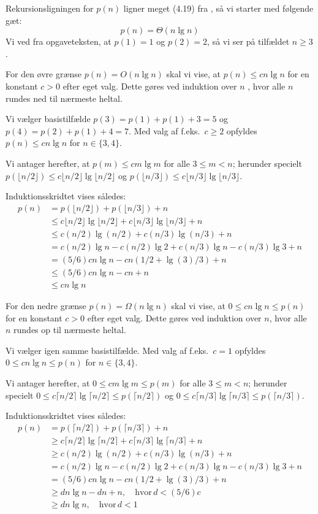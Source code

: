 \documentclass[paper=a4, fleqn]{article}
\newcommand{\clrs}{\textsmaller{CLRS}\xspace}
\begin{document}
Rekursionsligningen for $p(n)$ ligner meget (4.19) fra \clrs, så vi starter
med følgende gæt:
\[
p(n)=\Theta(n\lg n)
\]
Vi ved fra opgaveteksten, at $p(1)=1$ og $p(2)=2$, så vi ser på tilfældet $n\geq
3$.

For den øvre grænse $p(n)=O(n\lg n)$ skal vi vise, at $p(n)\leq cn\lg n$ for en
konstant $c>0$ efter eget valg. Dette gøres ved induktion over $n$ , hvor alle
$n$ rundes ned til nærmeste heltal.

Vi vælger basistilfælde $p(3)=p(1)+p(1)+3 = 5$ og $p(4)=p(2)+p(1)+4=7$. Med valg
af f.eks.\ $c\geq 2$ opfyldes $p(n)\leq cn\lg n$ for $n\in\{3,4\}$.

Vi antager herefter, at $p(m)\leq cm\lg m$ for alle $3\leq m<n$; herunder
specielt $p(\lfloor n/2\rfloor)\leq c\lfloor n/2\rfloor\lg \lfloor n/2\rfloor$
og $p(\lfloor n/3\rfloor)\leq c\lfloor n/3\rfloor\lg \lfloor n/3\rfloor$.

Induktionsskridtet vises således:
\begin{align*}
p(n) &= p(\lfloor n/2\rfloor)+p(\lfloor n/3\rfloor)+n \\
     &\leq c\lfloor n/2\rfloor\lg \lfloor n/2\rfloor + c\lfloor n/3\rfloor\lg
     \lfloor n/3\rfloor + n \\
     &\leq c(n/2)\lg(n/2) + c(n/3)\lg(n/3) + n \\
     &= c(n/2)\lg n - c(n/2)\lg 2 + c(n/3)\lg n - c(n/3)\lg 3 + n \\
     &= (5/6)cn\lg n - cn(1/2 + \lg(3)/3) + n \\
     &\leq (5/6)cn\lg n - cn + n \\
     &\leq cn\lg n
\end{align*}

For den nedre grænse $p(n)=\Omega(n\lg n)$ skal vi vise, at $0\leq cn\lg n\leq p(n)$
for en konstant $c>0$ efter eget valg. Dette gøres ved induktion over $n$, hvor
alle $n$ rundes op til nærmeste heltal.

Vi vælger igen samme basistilfælde. Med valg af f.eks.\ $c=1$ opfyldes
$0\leq cn\lg n\leq p(n)$ for $n\in\{3,4\}$.

Vi antager herefter, at $0\leq cm\lg m\leq p(m)$ for alle $3\leq m<n$; herunder
specielt $0\leq c\lceil n/2\rceil\lg \lceil n/2\rceil\leq p(\lceil
n/2\rceil)$ og $0\leq c\lceil n/3\rceil\lg \lceil n/3\rceil\leq p(\lceil
n/3\rceil)$.

Induktionsskridtet vises således:
\begin{align*}
p(n) &= p(\lceil n/2\rceil)+p(\lceil n/3\rceil)+n \\
     &\geq c\lceil n/2\rceil\lg \lceil n/2\rceil + c\lceil n/3\rceil\lg
     \lceil n/3\rceil + n \\
     &\geq c(n/2)\lg(n/2) + c(n/3)\lg(n/3) + n \\
     &= c(n/2)\lg n - c(n/2)\lg 2 + c(n/3)\lg n - c(n/3)\lg 3 + n \\
     &= (5/6)cn\lg n - cn(1/2 + \lg(3)/3) + n \\
     &\geq dn\lg n - dn + n,\quad\mathrm{hvor}\,d<(5/6)c \\
     &\geq dn\lg n,\quad\mathrm{hvor}\,d<1
\end{align*}
\end{document}
